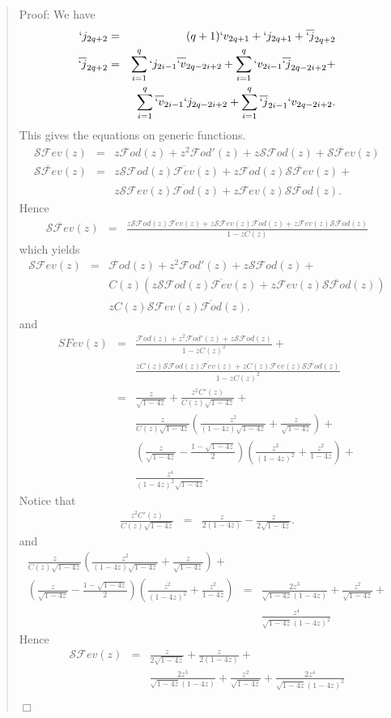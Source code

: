 \documentclass[preprint,authoryear]{elsarticle}
\newenvironment{proof}[1]{\begin{quotation}\noindent\textsf{Proof:} #1}{\(\Box\)\end{quotation}}
\newcommand{\Fev}{\mathcal{F}ev}
\newcommand{\Fevb}{\overline{\mathcal{F}ev}}
\newcommand{\Fod}{\mathcal{F}od}
\newcommand{\Fodb}{\overline{\mathcal{F}od}}
\newcommand{\SFev}{\mathcal{SF}ev}
\newcommand{\SFevb}{\overline{\mathcal{SF}ev}}
\newcommand{\SFod}{\mathcal{SF}od}
\newcommand{\SFodb}{\overline{\mathcal{SF}od}}
\newcommand{\phib}[1]{\overline{`v}_{#1}}
\newcommand{\psib}[1]{\overline{`j}_{#1}}
\begin{document}
\begin{proof}{}
  We have
  \begin{eqnarray*}
    `j_{2q+2} &=& (q+1)`v_{2q+1} + `j_{2q+1} + \psib{2q+2}\\
    \psib{2q+2} &=& \sum_{i=1}^{q}`j_{2i-1}\phib{2q-2i+2} + \sum_{i=1}^q
    `v_{2i-1}\psib{2q-2i+2} +\\
    && \sum_{i=1}^q \phib{2i-1} `j_{2q-2i+2} + \sum_{i=1}^q\psib{2i-1} `v_{2q-2i+2}.
  \end{eqnarray*}
This gives the equations on generic functions.
\begin{eqnarray*}
\SFev(z) &=& z \Fod(z) + z^2\Fod'(z) + z \SFod(z) + \SFevb(z)\\
  \SFevb(z) &=& z \SFod(z)\Fevb(z) + z \Fod(z) \SFevb(z) +\\
  && z \SFev(z) \Fodb(z) + z \Fev(z)\SFodb(z).
\end{eqnarray*}
Hence
\begin{eqnarray*}
  \SFevb(z) &=& \frac{z \SFod(z)\Fevb(z) + z \SFev(z) \Fodb(z) + z \Fev(z)\SFodb(z)}{1-zC(z)}
\end{eqnarray*}
which yields
\begin{eqnarray*}
  \SFev(z) & = &  \Fod(z) + z^2\Fod'(z) + z \SFod(z) + \\
  && C(z) ( z \SFod(z)\Fevb(z) + z \Fev(z)\SFodb(z)) \\
  && z C(z) \SFev(z) \Fodb(z).
\end{eqnarray*}
and
\begin{eqnarray*}
  SFev(z) &=& \frac{\Fod(z) + z^2\Fod'(z) + z \SFod(z)}{1-z C(z)^2}+ \\
  && \frac{z C(z) \SFod(z)\Fevb(z) + z    C(z)\Fev(z)\SFodb(z)}{1-z C(z)^2}\\
 &=& \frac{z}{\sqrt{1-4z}} + \frac{z^2 C'(z)}{C(z)\sqrt{1-4z}} + \\
 && \frac{z}{C(z)\sqrt{1-4z}}\left(\frac{z^2}{(1-4z)\sqrt{1-4z}} +  \frac{z}{\sqrt{1-4z}}\right) + \\
 && \left( \frac{z}{\sqrt{1-4z}} - \frac{1-\sqrt{1-4z}}{2}\right)\left( \frac{z^2}{(1-4z)^2} + \frac{z^2}{1-4z}\right) + \\
&& \frac{z^4}{(1-4z)^2\sqrt{1-4z}}.
\end{eqnarray*}
Notice that
\begin{eqnarray*}
  \frac{z^2 C'(z)}{C(z)\sqrt{1-4z}} &=&\frac{z}{2(1-4z)} - \frac{z}{2\sqrt{1-4z}}.
      \end{eqnarray*}
and
  \begin{eqnarray*}
 \frac{z}{C(z)\sqrt{1-4z}}\left(\frac{z^2}{(1-4z)\sqrt{1-4z}} +
   \frac{z}{\sqrt{1-4z}}\right)  + \\
\left( \frac{z}{\sqrt{1-4z}} - \frac{1-\sqrt{1-4z}}{2}\right)\left( \frac{z^2}{(1-4z)^2} +
  \frac{z^2}{1-4z}\right)  &=& \frac{2z^3 }{\sqrt{1-4z}(1-4z)} +
\frac{z^2}{\sqrt{1-4z}}+\\
&&\frac{z^4}{\sqrt{1-4z}(1-4z)^2} 
\end{eqnarray*}
Hence
\begin{eqnarray*}
  \SFev(z) &=& \frac{z}{2\sqrt{1-4z}} + \frac{z}{2(1-4z)} +\\ && \frac{2z^3 }{\sqrt{1-4z}(1-4z)} +
\frac{z^2}{\sqrt{1-4z}}+\frac{2z^4}{\sqrt{1-4z}(1-4z)^2} 
\end{eqnarray*}


\end{proof}
\end{document}
